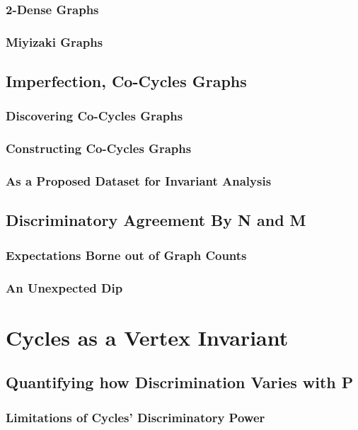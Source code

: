 \documentclass[11pt,a4paper]{report}
\begin{document}
\subsection{2-Dense Graphs}
\subsection{Miyizaki Graphs}

\section{Imperfection, Co-Cycles Graphs}
\subsection{Discovering Co-Cycles Graphs}
\subsection{Constructing Co-Cycles Graphs}
\subsection{As a Proposed Dataset for Invariant Analysis}

\section{Discriminatory Agreement By N and M}
\subsection{Expectations Borne out of Graph Counts}
\subsection{An Unexpected Dip}



\chapter{Cycles as a Vertex Invariant}

\section{Quantifying how Discrimination Varies with P}
\subsection{Limitations of Cycles' Discriminatory Power}
\end{document}
